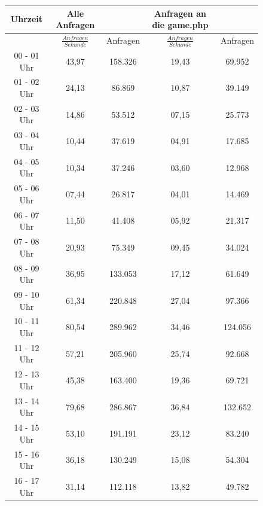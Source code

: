 \documentclass[10pt]{scrartcl}
\begin{document}
  \begin{figure}[htbp]
    \centering

    \begin{tabular}{|c|c|c|c|c|}
    \hline
    Uhrzeit & Alle Anfragen &  & Anfragen an die game.php & \\
    \hline
            & $\frac{Anfragen}{Sekunde}$ & Anfragen  & $\frac{Anfragen}{Sekunde}$ & Anfragen \\
    \hline
    00 - 01 Uhr & 43,97 & 158.326  & 19,43 & 69.952 \\
    \hline                         
    01 - 02 Uhr & 24,13 & 86.869   & 10,87 & 39.149 \\
    \hline                         
    02 - 03 Uhr & 14,86 & 53.512   & 07,15 & 25.773 \\
    \hline                         
    03 - 04 Uhr & 10,44 & 37.619   & 04,91 & 17.685 \\
    \hline                         
    04 - 05 Uhr & 10,34 & 37.246   & 03,60 & 12.968 \\
    \hline                         
    05 - 06 Uhr & 07,44 & 26.817   & 04,01 & 14.469 \\
    \hline                         
    06 - 07 Uhr & 11,50 & 41.408   & 05,92 & 21.317 \\
    \hline                         
    07 - 08 Uhr & 20,93 & 75.349   & 09,45 & 34.024 \\
    \hline                         
    08 - 09 Uhr & 36,95 & 133.053  & 17,12 & 61.649 \\
    \hline                         
    09 - 10 Uhr & 61,34 & 220.848  & 27,04 & 97.366 \\
    \hline                         
    10 - 11 Uhr & 80,54 & 289.962  & 34,46 & 124.056 \\
    \hline                         
    11 - 12 Uhr & 57,21 & 205.960  & 25,74 & 92.668 \\
    \hline                         
    12 - 13 Uhr & 45,38 & 163.400  & 19,36 & 69.721 \\
    \hline                         
    13 - 14 Uhr & 79,68 & 286.867  & 36,84 & 132.652 \\
    \hline                         
    14 - 15 Uhr & 53,10 & 191.191  & 23,12 & 83.240 \\
    \hline                         
    15 - 16 Uhr & 36,18 & 130.249  & 15,08 & 54.304 \\
    \hline                         
    16 - 17 Uhr & 31,14 & 112.118  & 13,82 & 49.782 \\

\end{tabular}
\end{figure}
\end{document}
